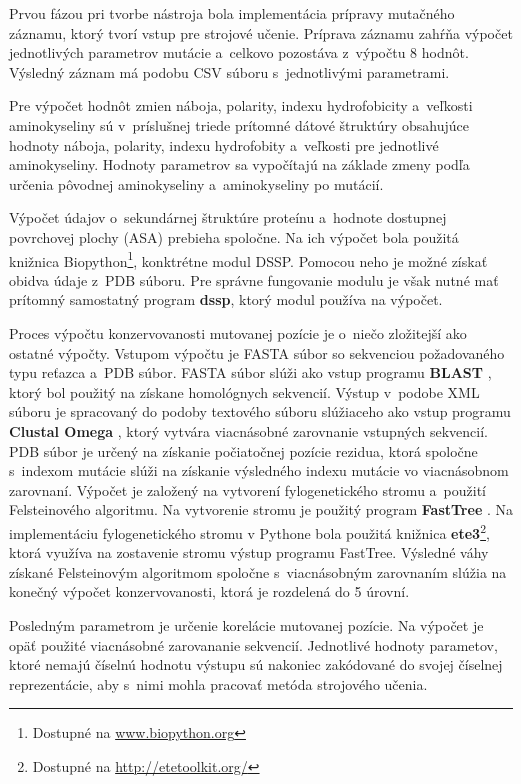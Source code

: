Prvou fázou pri tvorbe nástroja bola implementácia prípravy mutačného záznamu, ktorý tvorí vstup pre strojové učenie. Príprava záznamu zahŕňa výpočet jednotlivých parametrov mutácie a~celkovo pozostáva z~výpočtu 8 hodnôt. Výsledný záznam má podobu CSV súboru s~jednotlivými parametrami.

Pre výpočet hodnôt zmien náboja, polarity, indexu hydrofobicity a~veľkosti aminokyseliny sú v~príslušnej triede prítomné dátové štruktúry obsahujúce hodnoty náboja, polarity, indexu hydrofobity a~veľkosti pre jednotlivé aminokyseliny. Hodnoty parametrov sa vypočítajú na základe zmeny podľa určenia pôvodnej aminokyseliny a~aminokyseliny po mutácií.

Výpočet údajov o~sekundárnej štruktúre proteínu a~hodnote dostupnej povrchovej plochy (ASA) prebieha spoločne. Na ich výpočet bola použitá knižnica Biopython\footnote{Dostupné na \url{www.biopython.org}}, konktrétne modul DSSP. Pomocou neho je možné získať obidva údaje z~PDB súboru. Pre správne fungovanie modulu je však nutné mať prítomný samostatný program \textbf{dssp}, ktorý modul používa na výpočet.

Proces výpočtu konzervovanosti mutovanej pozície je o~niečo zložitejší ako ostatné výpočty. Vstupom výpočtu je FASTA súbor so sekvenciou požadovaného typu reťazca a~PDB súbor. FASTA súbor slúži ako vstup programu \textbf{BLAST} \cite{blastp}, ktorý bol použitý na získane homológnych sekvencií. Výstup v~podobe XML súboru je spracovaný do podoby textového súboru slúžiaceho ako vstup programu \textbf{Clustal Omega} \cite{clustal}, ktorý vytvára viacnásobné zarovnanie vstupných sekvencií.
PDB súbor je určený na získanie počiatočnej pozície rezidua, ktorá spoločne s~indexom mutácie slúži na získanie výsledného indexu mutácie vo viacnásobnom zarovnaní. Výpočet je založený na vytvorení fylogenetického stromu a~použití Felsteinového algoritmu. Na vytvorenie stromu je použitý program \textbf{FastTree} \cite{fasttree}. Na implementáciu fylogenetického stromu v Pythone bola použitá knižnica \textbf{ete3}\footnote{Dostupné na \url{http://etetoolkit.org/}}, ktorá využíva na zostavenie stromu výstup programu FastTree. Výsledné váhy získané Felsteinovým algoritmom spoločne s~viacnásobným zarovnaním slúžia na konečný výpočet konzervovanosti, ktorá je rozdelená do 5 úrovní.

Posledným parametrom je určenie korelácie mutovanej pozície. Na výpočet je opäť použité viacnásobné zarovananie sekvencií. Jednotlivé hodnoty parametov, ktoré nemajú číselnú hodnotu výstupu sú nakoniec zakódované do svojej číselnej reprezentácie, aby s~nimi mohla pracovať metóda strojového učenia.

